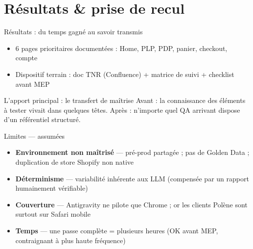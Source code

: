 \section{Résultats \& prise de recul}

\begin{frame}{Résultats : du temps gagné au savoir transmis}
  \begin{itemize}
    \item \alert{6 pages prioritaires} documentées : Home, PLP, PDP, panier, checkout, compte
    \item Dispositif terrain : doc TNR (Confluence) + matrice de suivi + checklist avant MEP
  \end{itemize}
  \vskip 6pt
  \begin{block}{L'apport principal : le transfert de maîtrise}
    Avant : la connaissance des éléments à tester vivait dans \alert{quelques têtes}.
    Après : n'importe quel QA arrivant dispose d'un \alert{référentiel structuré}.
  \end{block}
\end{frame}

\begin{frame}{Limites --- assumées}
  \begin{itemize}
    \item \textbf{Environnement non maîtrisé} --- pré-prod partagée ; pas de Golden Data ; duplication de store Shopify non native
    \item \textbf{Déterminisme} --- variabilité inhérente aux LLM (compensée par un rapport humainement vérifiable)
    \item \textbf{Couverture} --- Antigravity ne pilote que Chrome ; or les clients Polène sont surtout sur Safari mobile
    \item \textbf{Temps} --- une passe complète = plusieurs heures (OK avant MEP, contraignant à plus haute fréquence)
  \end{itemize}
\end{frame}

